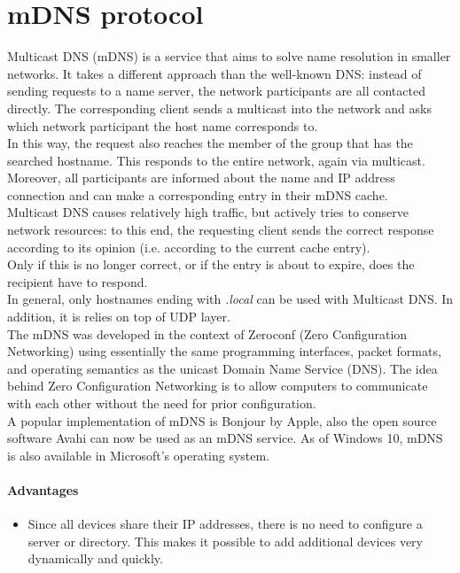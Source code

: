 \documentclass[fleqn, 10pt]{SelfArx} %
\begin{document}


\section{mDNS protocol}
Multicast DNS (mDNS) is a service that aims to solve name resolution in smaller networks. It takes a different approach than the well-known DNS: instead of sending requests to a name server, the network participants are all contacted directly.
The corresponding client sends a multicast into the network and asks which network participant the host name corresponds to. \\
In this way, the request also reaches the member of the group that has the searched hostname. This responds to the entire network, again via multicast. Moreover, all participants are informed about the name and IP address connection and can make a corresponding entry in their mDNS cache. \\
Multicast DNS causes relatively high traffic, but actively tries to conserve network resources: to this end, the requesting client sends the correct response according to its opinion (i.e. according to the current cache entry). \\ Only if this is no longer correct, or if the entry is about to expire, does the recipient have to respond. \\
In general, only hostnames ending with {\it{.local}} can be used with Multicast DNS. In addition, it is relies on top of UDP layer.\\
The mDNS was developed in the context of Zeroconf (Zero Configuration Networking) using essentially the same programming interfaces, packet formats, and operating semantics as the unicast Domain Name Service (DNS). The idea behind Zero Configuration Networking is to allow computers to communicate with each other without the need for prior configuration.\\
A popular implementation of mDNS is Bonjour by Apple, also the open source software Avahi can now be used as an mDNS service. As of Windows 10, mDNS is also available in Microsoft's operating system.

\paragraph{Advantages} 
\begin{itemize}[leftmargin=*]
    \item Since all devices share their IP addresses, there is no need to configure a server or directory. This makes it possible to add additional devices very dynamically and quickly.
\end{itemize}
\end{document}
